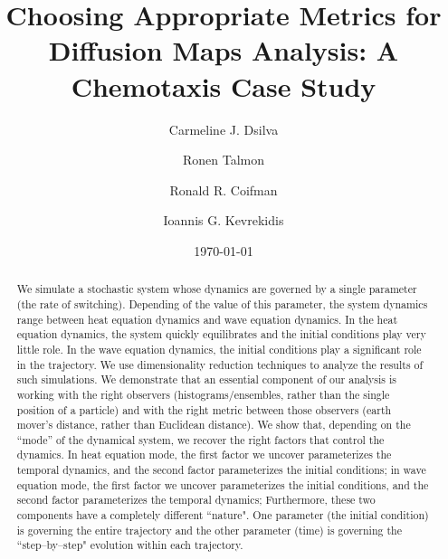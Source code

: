 \documentclass[prl, reprint, final]{revtex4-1}
\begin{document}
\title{Choosing Appropriate Metrics for Diffusion Maps Analysis: A Chemotaxis Case Study}

\author{Carmeline J. Dsilva}

\author{Ronen Talmon}

\author{Ronald R. Coifman}

\author{Ioannis G. Kevrekidis}

\date{\today}

\begin{abstract}

We simulate a stochastic system whose dynamics are governed by a single parameter (the rate of switching).
%
Depending of the value of this parameter, the system dynamics range between heat equation dynamics and wave equation dynamics. 
%
In the heat equation dynamics, the system quickly equilibrates and the initial conditions play very little role. 
%
In the wave equation dynamics, the initial conditions play a significant role in the trajectory.
%
We use dimensionality reduction techniques to analyze the results of such simulations.
%
We demonstrate that an essential component of our analysis is working with the right observers (histograms/ensembles, rather than the single position of a particle) and with the right metric between those observers (earth mover's distance, rather than Euclidean distance).
%
We show that, depending on the ``mode'' of the dynamical system, we recover the right factors that control the dynamics.
%
In heat equation mode, the first factor we uncover parameterizes the temporal dynamics, and the second factor parameterizes the initial conditions;
in wave equation mode, the first factor we uncover parameterizes the initial conditions, and the second factor parameterizes the temporal dynamics; 
%
Furthermore, these two components have a completely different ``nature". 
%
One parameter (the initial condition) is governing the entire trajectory and the other parameter (time) is governing the ``step­--by­--step" evolution within each trajectory.

\end{abstract}
\end{document}
